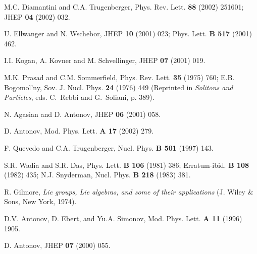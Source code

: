 \documentclass[a4paper,12pt]{article}
\begin{document}
\begin{thebibliography}{99}
M.C. Diamantini and C.A. Trugenberger, Phys. Rev. Lett. {\bf 88} (2002) 251601; JHEP {\bf 04} (2002) 032.

U. Ellwanger and N. Wschebor, JHEP {\bf 10} (2001) 023;
Phys. Lett. {\bf B 517} (2001) 462.

I.I. Kogan, A. Kovner and M. Schvellinger,
JHEP {\bf 07} (2001) 019.

M.K. Prasad and C.M. Sommerfield, Phys. Rev. Lett. {\bf 35} (1975) 760;
E.B. Bogomol'ny, Sov. J. Nucl. Phys. {\bf 24} (1976) 449
(Reprinted in {\it Solitons and Particles}, eds. C.~Rebbi and G.~Soliani, p. 389).

N. Agasian and D. Antonov, JHEP {\bf 06} (2001) 058.

D. Antonov, Mod. Phys. Lett. {\bf A 17} (2002) 279.

F. Quevedo and C.A. Trugenberger,
Nucl. Phys. {\bf B 501} (1997) 143.

S.R. Wadia and S.R. Das, Phys. Lett. {\bf B 106} (1981) 386; Erratum-ibid.
{\bf B 108} (1982) 435;
N.J. Snyderman, Nucl. Phys. {\bf B 218} (1983) 381.

R. Gilmore, {\it Lie groups, Lie algebras, and some of their applications}
(J. Wiley \& Sons, New York, 1974).


D.V. Antonov, D. Ebert, and Yu.A. Simonov, Mod. Phys. Lett. {\bf A 11} (1996) 1905.


D. Antonov, JHEP {\bf 07} (2000) 055.


\end{thebibliography}
\end{document}
